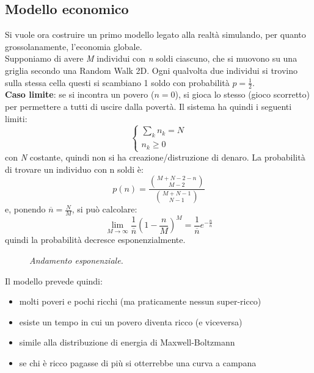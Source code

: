 \documentclass[12pt, a4paper]{book}
\theoremstyle{theorem}
\begin{document}
			\subsection{Modello economico}
				Si vuole ora costruire un primo modello legato alla realtà simulando, per quanto grossolanamente, l'economia globale.\\
				Supponiamo di avere \textit{M} individui con \textit{n} soldi ciascuno, che si muovono su una griglia secondo una Random Walk 2D.
				Ogni qualvolta due individui si trovino sulla stessa cella questi si scambiano 1 soldo con probabilità $p=\frac{1}{2}$.\\
				\textbf{Caso limite}: se si incontra un povero ($n=0$), si gioca lo stesso (gioco scorretto) per permettere a tutti di uscire dalla povertà.
				Il sistema ha quindi i seguenti limiti:
				\begin{equation*}
					\begin{cases}
						\sum_kn_k=N\\
						n_k\geq 0
					\end{cases}
				\end{equation*}
				con \textit{N} costante, quindi non si ha creazione/distruzione di denaro.
				La probabilità di trovare un individuo con n soldi è:
				\begin{equation*}
					p(n)=\frac{\binom{M+N-2-n}{M-2}}{\binom{M+N-1}{N-1}}
				\end{equation*}
				e, ponendo $\overline{n}=\frac{N}{M}$, si può calcolare:
				\begin{equation}
					\lim_{M\to\infty}\frac{1}{\overline{n}}\left( 1-\frac{n}{M}\right)^M=\frac{1}{\overline{n}}e^{-\frac{n}{\bar{n}}}
				\end{equation}
				quindi la probabilità decresce esponenzialmente.\\
				\begin{figure}[H]
					\centering
					\caption{\emph{Andamento esponenziale.}}
					\label{figure:modello_economico}
				\end{figure}
				Il modello prevede quindi:
				\begin{itemize}
					\item molti poveri e pochi ricchi (ma praticamente nessun super-ricco)
					\item esiste un tempo in cui un povero diventa ricco (e viceversa)
					\item simile alla distribuzione di energia di Maxwell-Boltzmann
					\item se chi è ricco pagasse di più si otterrebbe una curva a campana
				\end{itemize}
\end{document}
